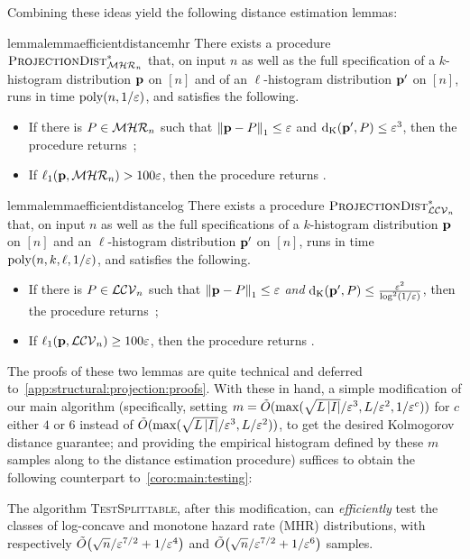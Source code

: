 \noindent Combining these ideas yield the following distance estimation lemmas:
\begin{restatable}{lemma}{lemmaefficientdistancemhr}\label{lemma:distance:mhr:eff}
  There exists a procedure $\estimdist[\classmhr]^\ast$ that, on input $n$ as well as the full specification of a $k$-histogram distribution $\D$ on $[n]$ and of an $\ell$-histogram distribution $\D^{\prime}$ on $[n]$, runs in time $\poly(n,1/\eps)$, and satisfies the following.
  \begin{itemize}
    \item If there is $P\in\classmhr$ such that $\normone{\D-P} \leq \eps$  and $\kolmogorov{\D^\prime}{P} \leq \eps^3$, then the procedure returns~\yes;
    \item If $\lp[1](\D,\classmhr) > 100\eps$, then the procedure returns \no.
  \end{itemize}
\end{restatable}

\begin{restatable}{lemma}{lemmaefficientdistancelog}\label{lemma:distance:log:eff}
  There exists a procedure $\estimdist[\classlogconcave]^\ast$ that, on input $n$ as well as the full specifications of a $k$-histogram distribution $\D$ on $[n]$ and an $\ell$-histogram distribution $\D^\prime$ on $[n]$, runs in time $\poly(n,k,\ell,1/\eps)$, and satisfies the following.
  \begin{itemize}
    \item If there is $P\in\classlogconcave$ such that $\normone{\D-P}\leq \eps$ \emph{and} $\kolmogorov{\D^\prime}{P}\leq \frac{\eps^2}{\log^2(1/\eps)}$, then the procedure returns~\yes;
    \item If $\lp[1](\D,\classlogconcave) \geq 100\eps$, then the procedure returns \no.
  \end{itemize}
\end{restatable}

The proofs of these two lemmas are quite technical and deferred to~\cref{app:structural:projection:proofs}. With these in hand, a simple modification of our main algorithm (specifically, setting $m = \tilde{O}( \max({\sqrt{L\abs{I}}}/{\eps^3}, {L}/{\eps^2}, {1}/{\eps^c} ) )$ for $c$ either $4$ or $6$ instead of $\tilde{O}( \max ( {\sqrt{L\abs{I}}}/{\eps^3}, {L}/{\eps^2} ) )$, to get the desired Kolmogorov distance guarantee; and providing the empirical histogram defined by these $m$ samples along to the distance estimation procedure) suffices to obtain the following counterpart to~\cref{coro:main:testing}:
\begin{corollary}\label{coro:main:testing:eff}
The algorithm \textsc{TestSplittable}, after this modification, can \emph{efficiently} test the classes of log-concave and monotone hazard rate (MHR) distributions, with respectively $\tilde{O}\big({\sqrt{n}/\eps^{7/2} + 1/\eps^4}\big)$ and $\tilde{O}\big({\sqrt{n}/\eps^{7/2} + 1/\eps^6}\big)$ samples.
\end{corollary}

